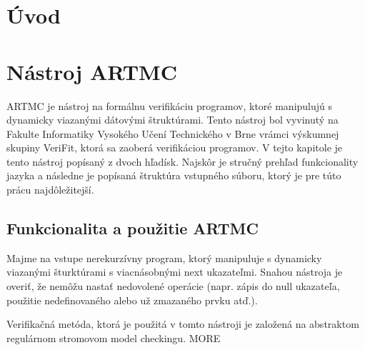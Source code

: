 
\chapter{Úvod}

\chapter{Nástroj ARTMC}
ARTMC je nástroj na formálnu verifikáciu programov, ktoré manipulujú s
dynamicky viazanými dátovými štruktúrami. Tento nástroj bol vyvinutý na Fakulte
Informatiky Vysokého Učení Technického v Brne vrámci výskumnej skupiny VeriFit,
ktorá sa zaoberá verifikáciou programov. V tejto kapitole je tento nástroj
popísaný z dvoch hľadísk. Najskôr je stručný prehľad funkcionality jazyka a
následne je popísaná štruktúra vstupného súboru, ktorý je pre túto prácu
najdôležitejší.

\section{Funkcionalita a použitie ARTMC}
Majme na vstupe nerekurzívny program, ktorý manipuluje s dynamicky viazanými
šturktúrami s viacnásobnými next ukazateľmi. Snahou nástroja je overiť, že
nemôžu nastať nedovolené operácie (napr. zápis do null ukazateľa, použitie
nedefinovaného alebo už zmazaného prvku atď.).

Verifikačná metóda, ktorá je použitá v tomto nástroji je založená na abstraktom
regulárnom stromovom model checkingu. MORE 

